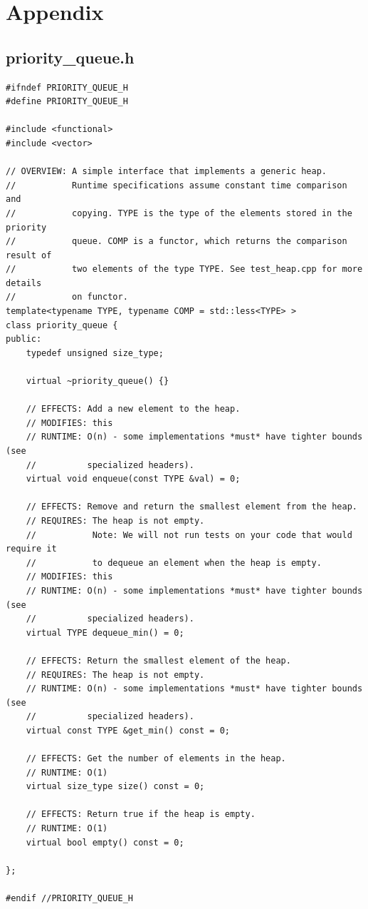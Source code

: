 \documentclass[12pt,a4paper]{article}
\theoremstyle{definition}
\begin{document}
\section*{Appendix}
\subsection*{priority\_queue.h}
\begin{lstlisting}
#ifndef PRIORITY_QUEUE_H
#define PRIORITY_QUEUE_H

#include <functional>
#include <vector>

// OVERVIEW: A simple interface that implements a generic heap.
//           Runtime specifications assume constant time comparison and
//           copying. TYPE is the type of the elements stored in the priority
//           queue. COMP is a functor, which returns the comparison result of
//           two elements of the type TYPE. See test_heap.cpp for more details
//           on functor.
template<typename TYPE, typename COMP = std::less<TYPE> >
class priority_queue {
public:
    typedef unsigned size_type;

    virtual ~priority_queue() {}

    // EFFECTS: Add a new element to the heap.
    // MODIFIES: this
    // RUNTIME: O(n) - some implementations *must* have tighter bounds (see
    //          specialized headers).
    virtual void enqueue(const TYPE &val) = 0;

    // EFFECTS: Remove and return the smallest element from the heap.
    // REQUIRES: The heap is not empty.
    //           Note: We will not run tests on your code that would require it
    //           to dequeue an element when the heap is empty.
    // MODIFIES: this
    // RUNTIME: O(n) - some implementations *must* have tighter bounds (see
    //          specialized headers).
    virtual TYPE dequeue_min() = 0;

    // EFFECTS: Return the smallest element of the heap.
    // REQUIRES: The heap is not empty.
    // RUNTIME: O(n) - some implementations *must* have tighter bounds (see
    //          specialized headers).
    virtual const TYPE &get_min() const = 0;

    // EFFECTS: Get the number of elements in the heap.
    // RUNTIME: O(1)
    virtual size_type size() const = 0;

    // EFFECTS: Return true if the heap is empty.
    // RUNTIME: O(1)
    virtual bool empty() const = 0;

};

#endif //PRIORITY_QUEUE_H
    
\end{lstlisting}
\end{document}
